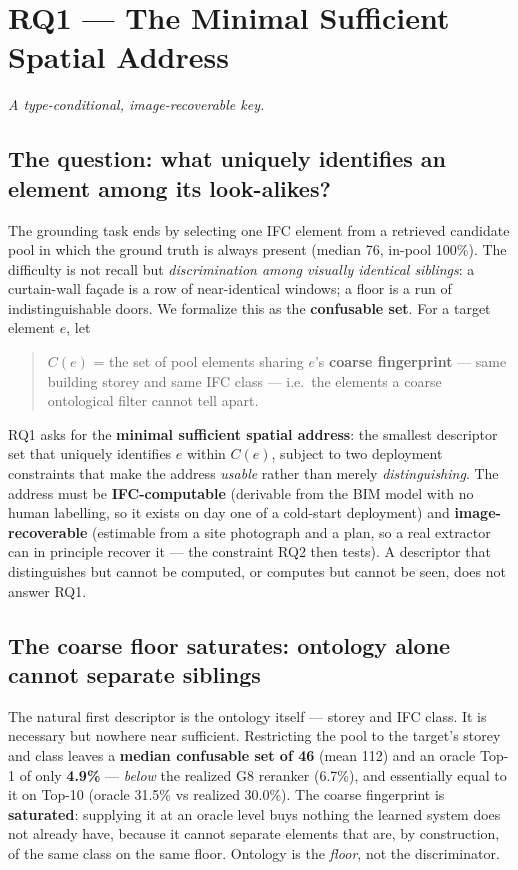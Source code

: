 \chapter{RQ1 --- The Minimal Sufficient Spatial Address}
\label{ch:rq1}

\emph{A type-conditional, image-recoverable key.}

\section{The question: what uniquely identifies an element among its look-alikes?}

The grounding task ends by selecting one IFC element from a retrieved candidate pool in which the
ground truth is always present (median 76, in-pool 100\%). The difficulty is not recall but
\emph{discrimination among visually identical siblings}: a curtain-wall fa\c{c}ade is a row of
near-identical windows; a floor is a run of indistinguishable doors. We formalize this as the
\textbf{confusable set}. For a target element $e$, let

\begin{quote}
$C(e)$ = the set of pool elements sharing $e$'s \textbf{coarse fingerprint} --- same building storey
and same IFC class --- i.e.\ the elements a coarse ontological filter cannot tell apart.
\end{quote}

RQ1 asks for the \textbf{minimal sufficient spatial address}: the smallest descriptor set that
uniquely identifies $e$ within $C(e)$, subject to two deployment constraints that make the address
\emph{usable} rather than merely \emph{distinguishing}. The address must be \textbf{IFC-computable}
(derivable from the BIM model with no human labelling, so it exists on day one of a cold-start
deployment) and \textbf{image-recoverable} (estimable from a site photograph and a plan, so a real
extractor can in principle recover it --- the constraint RQ2 then tests). A descriptor that
distinguishes but cannot be computed, or computes but cannot be seen, does not answer RQ1.

\section{The coarse floor saturates: ontology alone cannot separate siblings}

The natural first descriptor is the ontology itself --- storey and IFC class. It is necessary but
nowhere near sufficient. Restricting the pool to the target's storey and class leaves a \textbf{median
confusable set of 46} (mean 112) and an oracle Top-1 of only \textbf{4.9\%} --- \emph{below} the
realized G8 reranker (6.7\%), and essentially equal to it on Top-10 (oracle 31.5\% vs realized
30.0\%). The coarse fingerprint is \textbf{saturated}: supplying it at an oracle level buys nothing
the learned system does not already have, because it cannot separate elements that are, by
construction, of the same class on the same floor. Ontology is the \emph{floor}, not the
discriminator.

